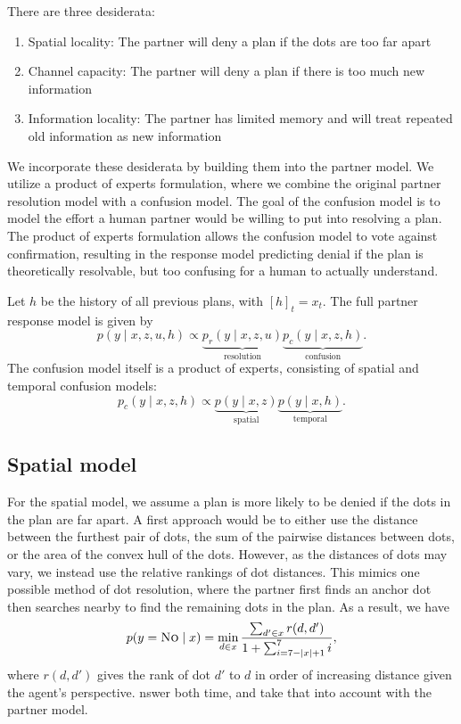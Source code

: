 \documentclass[11pt]{article}
\newcommand{\justin}[1]{{{\textcolor{purple}{(Justin: #1)}}}}
\begin{document}
There are three desiderata:
\begin{enumerate}
\item Spatial locality: The partner will deny a plan if the dots are too far apart
\item Channel capacity: The partner will deny a plan if there is too much new information
\item Information locality: The partner has limited memory and will treat repeated old information as new information
\end{enumerate}

We incorporate these desiderata by building them into the partner model.
We utilize a product of experts formulation,
where we combine the original partner resolution model
with a confusion model.
The goal of the confusion model is to model the effort a human partner would be willing to put into resolving a plan.
The product of experts formulation allows the confusion model to
vote against confirmation,
resulting in the response model predicting denial if the plan is theoretically resolvable, but too confusing for a human to actually understand.

Let $h$ be the history of all previous plans,
with $[h]_t = x_t$.
The full partner response model is given by
$$
p(y \mid x, z, u, h)
\propto \underbrace{p_r(y \mid x,z,u)}_{\text{resolution}}
\underbrace{p_c(y \mid x,z,h)}_{\text{confusion}}.
$$
The confusion model itself is a product of experts,
consisting of spatial and temporal confusion models:
$$
p_c(y\mid x,z,h) \propto
\underbrace{p(y \mid x,z)}_{\text{spatial}}
\underbrace{p(y \mid x,h)}_{\text{temporal}}.
$$

\subsection{Spatial model}
For the spatial model, we assume a plan is more likely to be denied if the dots in the plan are far apart.
A first approach would be to either use the distance between the furthest pair of dots, the sum of the pairwise distances between dots, or the area of the convex hull of the dots.
However, as the distances of dots may vary,
we instead use the relative rankings of dot distances.
This mimics one possible method of dot resolution, where the partner first finds an anchor dot then searches nearby to find the remaining dots in the plan.
As a result, we have
$$
p(y = \textsc{No} \mid x)
= \min_{d\in x} \frac{
\sum_{d'\in x} r(d,d')
}{
1+\sum_{i=7-|x|+1}^7 i
},
$$
where $r(d,d')$ gives the rank of dot $d'$ to $d$ in order of increasing distance given the agent's perspective.
nswer both time, and take that into account with the partner model.
\end{document}
